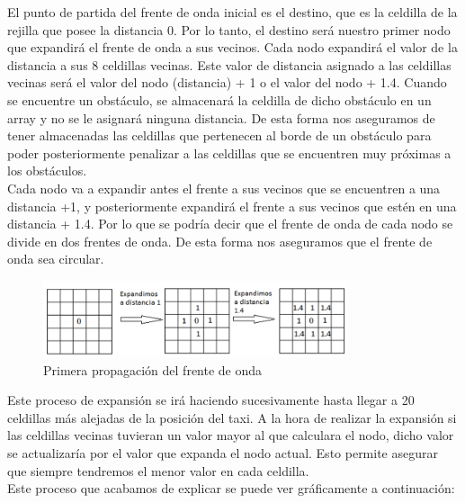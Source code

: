 El punto de partida del frente de onda inicial es el destino, que es la celdilla de la rejilla que posee la distancia 0. Por lo tanto, el destino será nuestro primer nodo que expandirá el frente de onda a sus vecinos. Cada nodo expandirá el valor de la distancia a sus 8 celdillas vecinas. Este valor de distancia asignado a las celdillas vecinas será el valor del nodo (distancia) + 1 o el valor del nodo + 1.4. Cuando se encuentre un obstáculo, se almacenará la celdilla de dicho obstáculo en un array y no se le asignará ninguna distancia. De esta forma nos aseguramos de tener almacenadas las celdillas que pertenecen al borde de un obstáculo para poder posteriormente penalizar a las celdillas que se encuentren muy próximas a los obstáculos.\\

Cada nodo va a expandir antes el frente a sus vecinos que se encuentren a una distancia +1, y posteriormente expandirá el frente a sus vecinos que estén en una distancia + 1.4. Por lo que se podría decir que el frente de onda de cada nodo se divide en dos frentes de onda. De esta forma nos aseguramos que el frente de onda sea circular.

\begin{figure}[H]
  \begin{center}
    \includegraphics[width=0.8\textwidth]{figures/GPP/primera_expansion.png}
		\caption{Primera propagación del frente de onda}
		\label{fig.primera_expansion_gpp}
		\end{center}
\end{figure}

Este proceso de expansión se irá haciendo sucesivamente hasta llegar a 20 celdillas más alejadas de la posición del taxi. A la hora de realizar la expansión si las celdillas vecinas tuvieran un valor mayor al que calculara el nodo, dicho valor se actualizaría por el valor que expanda el nodo actual. Esto permite asegurar que siempre tendremos el menor valor en cada celdilla.\\

Este proceso que acabamos de explicar se puede ver gráficamente a continuación:\\

